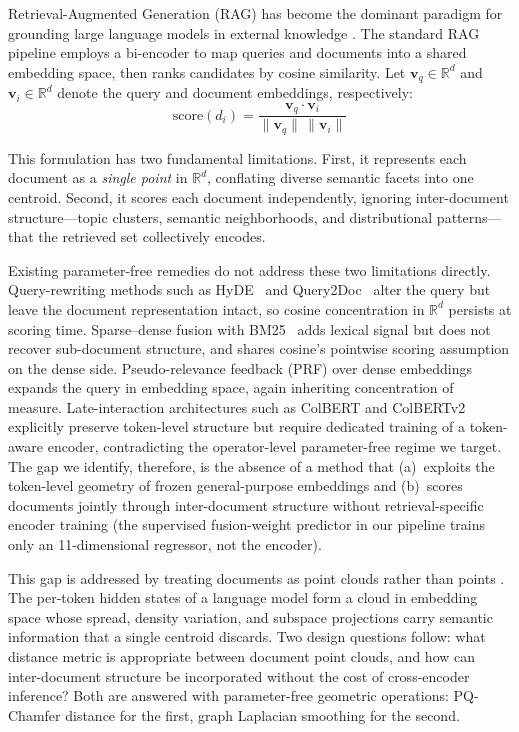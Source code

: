 \documentclass[review,1p]{elsarticle}
\newcommand{\R}{\mathbb{R}}
\begin{document}
Retrieval-Augmented Generation (RAG) has become the dominant paradigm for grounding large language models in external knowledge \citep{lewis2020rag,guu2020realm}. The standard RAG pipeline employs a bi-encoder to map queries and documents into a shared embedding space, then ranks candidates by cosine similarity. Let $\mathbf{v}_q \in \R^d$ and $\mathbf{v}_i \in \R^d$ denote the query and document embeddings, respectively:
\begin{equation}
\label{eq:cosine}
\text{score}(d_i) = \frac{\mathbf{v}_q \cdot \mathbf{v}_i}{\|\mathbf{v}_q\| \, \|\mathbf{v}_i\|}
\end{equation}

This formulation has two fundamental limitations. First, it represents each document as a \textit{single point} in $\R^d$, conflating diverse semantic facets into one centroid. Second, it scores each document independently, ignoring inter-document structure---topic clusters, semantic neighborhoods, and distributional patterns---that the retrieved set collectively encodes.

Existing parameter-free remedies do not address these two limitations directly. Query-rewriting methods such as HyDE~\citep{gao2023hyde} and Query2Doc~\citep{wang2023query2doc} alter the query but leave the document representation intact, so cosine concentration in $\R^d$ persists at scoring time. Sparse--dense fusion with BM25~\citep{robertson2009bm25} adds lexical signal but does not recover sub-document structure, and shares cosine's pointwise scoring assumption on the dense side. Pseudo-relevance feedback (PRF) over dense embeddings~\citep{li2023ance-prf} expands the query in embedding space, again inheriting concentration of measure. Late-interaction architectures such as ColBERT and ColBERTv2~\citep{khattab2020colbert,santhanam2022colbertv2} explicitly preserve token-level structure but require dedicated training of a token-aware encoder, contradicting the operator-level parameter-free regime we target. The gap we identify, therefore, is the absence of a method that (a)~exploits the token-level geometry of frozen general-purpose embeddings and (b)~scores documents jointly through inter-document structure without retrieval-specific encoder training (the supervised fusion-weight predictor in our pipeline trains only an 11-dimensional regressor, not the encoder).

This gap is addressed by treating documents as point clouds rather than points \citep{anonprior2026a}. The per-token hidden states of a language model form a cloud in embedding space whose spread, density variation, and subspace projections carry semantic information that a single centroid discards. Two design questions follow: what distance metric is appropriate between document point clouds, and how can inter-document structure be incorporated without the cost of cross-encoder inference? Both are answered with parameter-free geometric operations: PQ-Chamfer distance for the first, graph Laplacian smoothing for the second.
\end{document}
